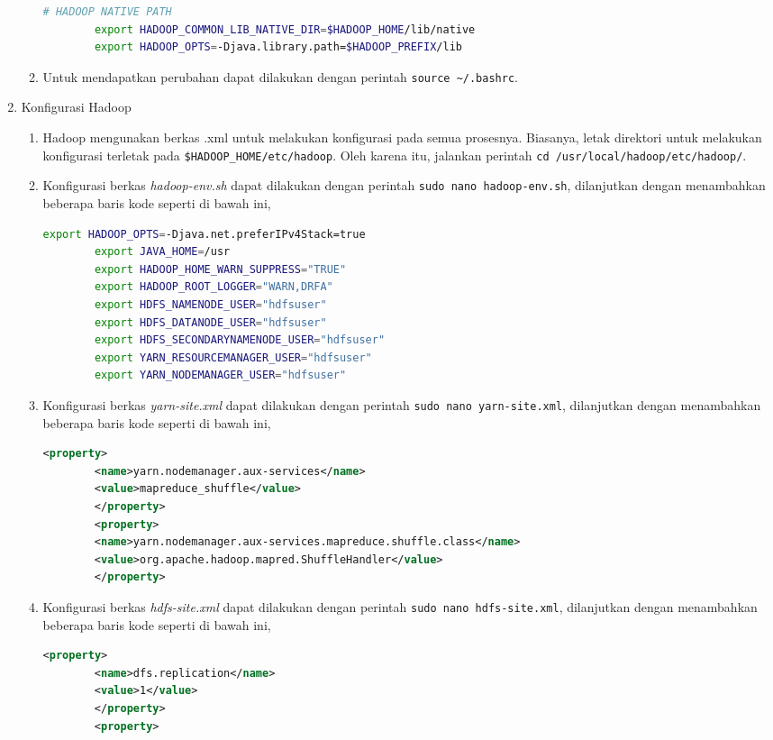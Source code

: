 \begin{enumerate}
\begin{enumerate}
\begin{lstlisting}[language=bash]
		# HADOOP NATIVE PATH
		export HADOOP_COMMON_LIB_NATIVE_DIR=$HADOOP_HOME/lib/native
		export HADOOP_OPTS=-Djava.library.path=$HADOOP_PREFIX/lib
      \end{lstlisting}
    \item Untuk mendapatkan perubahan dapat dilakukan dengan perintah \verb|source ~/.bashrc|.
  \end{enumerate}
  \item Konfigurasi Hadoop
  \begin{enumerate}
    \item Hadoop mengunakan berkas .xml untuk melakukan konfigurasi pada semua prosesnya. Biasanya, letak direktori untuk melakukan konfigurasi terletak pada \verb|$HADOOP_HOME/etc/hadoop|. Oleh karena itu, jalankan perintah \verb|cd /usr/local/hadoop/etc/hadoop/|.
    \item Konfigurasi berkas \textit{hadoop-env.sh} dapat dilakukan dengan perintah \verb|sudo nano hadoop-env.sh|, dilanjutkan dengan menambahkan beberapa baris kode seperti di bawah ini,
       \begin{lstlisting}[language=bash]
		export HADOOP_OPTS=-Djava.net.preferIPv4Stack=true
		export JAVA_HOME=/usr
		export HADOOP_HOME_WARN_SUPPRESS="TRUE"
		export HADOOP_ROOT_LOGGER="WARN,DRFA"
		export HDFS_NAMENODE_USER="hdfsuser"
		export HDFS_DATANODE_USER="hdfsuser"
		export HDFS_SECONDARYNAMENODE_USER="hdfsuser"
		export YARN_RESOURCEMANAGER_USER="hdfsuser"
		export YARN_NODEMANAGER_USER="hdfsuser"
      \end{lstlisting}
    \item Konfigurasi berkas \textit{yarn-site.xml} dapat dilakukan dengan perintah \verb|sudo nano yarn-site.xml|, dilanjutkan dengan menambahkan beberapa baris kode seperti di bawah ini,
       \begin{lstlisting}[language=XML]
		<property>
		<name>yarn.nodemanager.aux-services</name>
		<value>mapreduce_shuffle</value>
		</property>
		<property>
		<name>yarn.nodemanager.aux-services.mapreduce.shuffle.class</name>
		<value>org.apache.hadoop.mapred.ShuffleHandler</value>
		</property>
      \end{lstlisting}
    \item Konfigurasi berkas \textit{hdfs-site.xml} dapat dilakukan dengan perintah \verb|sudo nano hdfs-site.xml|, dilanjutkan dengan menambahkan beberapa baris kode seperti di bawah ini,
       \begin{lstlisting}[language=XML]
		<property>
		<name>dfs.replication</name>
		<value>1</value>
		</property>
		<property>

\end{lstlisting}
\end{enumerate}
\end{enumerate}
